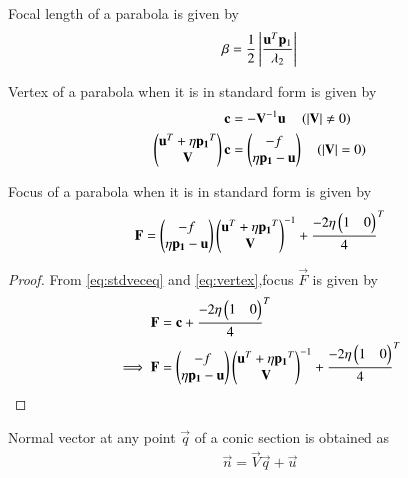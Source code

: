 \documentclass[journal,12pt,twocolumn]{IEEEtran}
\begin{document}
\begin{lemma}
Focal length of a parabola is given by
\begin{align}
\beta = \frac{1}{2}\left\vert\frac{\mathbf{u}^T\mathbf{p}_1}{\lambda_2}\right\vert \label{eq:foclen} \end{align}
\end{lemma}

\begin{lemma}
Vertex of a parabola when it is in standard form is given by 
\begin{align}
\mathbf{c} &= -\mathbf{V}^{-1}\mathbf{u} \quad \left(\left\vert\mathbf{V}\right\vert \neq 0\right) \label{eq:vertexneq}
\\
\begin{pmatrix}\mathbf{u}^T + \eta\mathbf{p_1}^T \\ \mathbf{V}\end{pmatrix}\mathbf{c} &= \begin{pmatrix}-f \\ \eta\mathbf{p_1} - \mathbf{u}\end{pmatrix} \quad \left(\left\vert\mathbf{V}\right\vert = 0\right) \label{eq:vertex}
\end{align}
\end{lemma}

\begin{lemma}
Focus of a parabola when it is in standard form is given by 
\begin{align}
\mathbf{F} = \begin{pmatrix}-f \\ \eta\mathbf{p_1} - \mathbf{u}\end{pmatrix}{\ensuremath{\begin{pmatrix}\mathbf{u}^T + \eta\mathbf{p_1}^T \\ \mathbf{V}\end{pmatrix}}}^{-1} + {\frac{-2\eta\begin{pmatrix}1 & 0\end{pmatrix}}{4}}^{T} \label{eq:focus}
\end{align}
\end{lemma}

\begin{proof}
From \eqref{eq:stdveceq} and \eqref{eq:vertex},focus $\vec{F}$ is given by
\begin{align}
\mathbf{F} &= \mathbf{c} + {\frac{-2\eta\begin{pmatrix}1 & 0\end{pmatrix}}{4}}^{T} \\
\implies \mathbf{F} &= \begin{pmatrix}-f \\ \eta\mathbf{p_1} - \mathbf{u}\end{pmatrix}{\ensuremath{\begin{pmatrix}\mathbf{u}^T + \eta\mathbf{p_1}^T \\ \mathbf{V}\end{pmatrix}}}^{-1} + {\frac{-2\eta\begin{pmatrix}1 & 0\end{pmatrix}}{4}}^{T}
\end{align}
\end{proof}

\begin{lemma}
Normal vector at any point $\vec{q}$ of a conic section is obtained as 
\begin{align}
    \vec{n}=\vec{V}\vec{q} + \vec{u}
\end{align}
\label{eq:norm}
\end{lemma}
\end{document}
